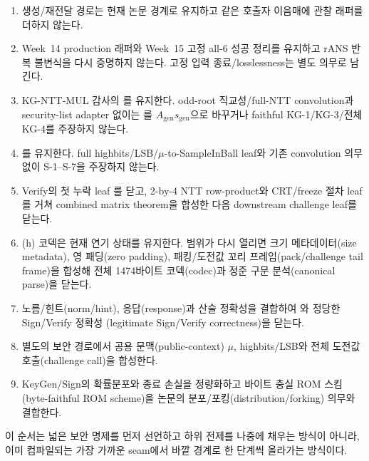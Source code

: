 \begin{enumerate}
  \item 생성/재전달 경로는 현재 논문 경계로 유지하고 같은 호출자 이음매에
        관찰 래퍼를 더하지 않는다.
  \item Week~14 production 래퍼와 Week~15 고정 all-6 성공 정리를 유지하고
        rANS 반복 불변식을 다시 증명하지 않는다. 고정 입력 종료/losslessness는
        별도 의무로 남긴다.
  \item KG-NTT-MUL 감사의 를 유지한다. odd-root
        직교성/full-NTT convolution과 security-list adapter 없이는
        를 \(A_{\mathrm{gen}}s_{\mathrm{gen}}\)으로 바꾸거나
        faithful KG-1/KG-3/전체 KG-4를 주장하지 않는다.
  \item {}를 유지한다. full
        highbits/LSB/\(\mu\)-to-SampleInBall leaf와 기존 convolution 의무 없이
        S-1--S-7을 주장하지 않는다.
  \item Verify의 첫 누락 leaf 를 닫고,
        2-by-4 NTT row-product와 CRT/freeze 절차 leaf를 거쳐 combined matrix
        theorem을 합성한 다음 downstream challenge leaf를 닫는다.
  \item (h) 코덱은 현재 연기 상태를 유지한다. 범위가 다시 열리면 크기
        메타데이터(size metadata), 영 패딩(zero padding), 패킹/도전값
        꼬리 프레임(pack/challenge tail frame)을 합성해 전체 1474바이트
        코덱(codec)과 정준 구문 분석(canonical parse)을 닫는다.
  \item 노름/힌트(norm/hint), 응답(response)과 산술 정확성을 결합하여
        와 정당한 Sign/Verify 정확성
        (legitimate Sign/Verify correctness)을 닫는다.
  \item 별도의 보안 경로에서 공용 문맥(public-context) \(\mu\),
        highbits/LSB와 전체 도전값 호출(challenge call)을 합성한다.
  \item KeyGen/Sign의 확률분포와 종료 손실을 정량화하고 바이트 충실 ROM 스킴
        (byte-faithful ROM scheme)을 논문의 분포/포킹(distribution/forking)
        의무와 결합한다.
\end{enumerate}

이 순서는 넓은 보안 명제를 먼저 선언하고 하위 전제를 나중에 채우는 방식이
아니라, 이미 컴파일되는 가장 가까운 seam에서 바깥 경계로 한 단계씩 올라가는
방식이다.

